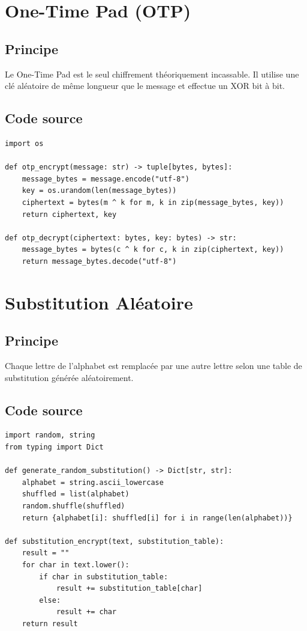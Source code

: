 \documentclass[12pt,a4paper]{report}
\begin{document}
\section{One-Time Pad (OTP)}

\subsection{Principe}
Le One-Time Pad est le seul chiffrement théoriquement incassable. Il utilise une clé aléatoire de même longueur que le message et effectue un XOR bit à bit.

\subsection{Code source}
\begin{lstlisting}[style=python,caption=OTP.py]
import os

def otp_encrypt(message: str) -> tuple[bytes, bytes]:
    message_bytes = message.encode("utf-8")
    key = os.urandom(len(message_bytes))
    ciphertext = bytes(m ^ k for m, k in zip(message_bytes, key))
    return ciphertext, key

def otp_decrypt(ciphertext: bytes, key: bytes) -> str:
    message_bytes = bytes(c ^ k for c, k in zip(ciphertext, key))
    return message_bytes.decode("utf-8")
\end{lstlisting}

\section{Substitution Aléatoire}

\subsection{Principe}
Chaque lettre de l'alphabet est remplacée par une autre lettre selon une table de substitution générée aléatoirement.

\subsection{Code source}
\begin{lstlisting}[style=python,caption=Substitution\_Aleatoire.py]
import random, string
from typing import Dict

def generate_random_substitution() -> Dict[str, str]:
    alphabet = string.ascii_lowercase
    shuffled = list(alphabet)
    random.shuffle(shuffled)
    return {alphabet[i]: shuffled[i] for i in range(len(alphabet))}

def substitution_encrypt(text, substitution_table):
    result = ""
    for char in text.lower():
        if char in substitution_table:
            result += substitution_table[char]
        else:
            result += char
    return result
\end{lstlisting}
\end{document}

